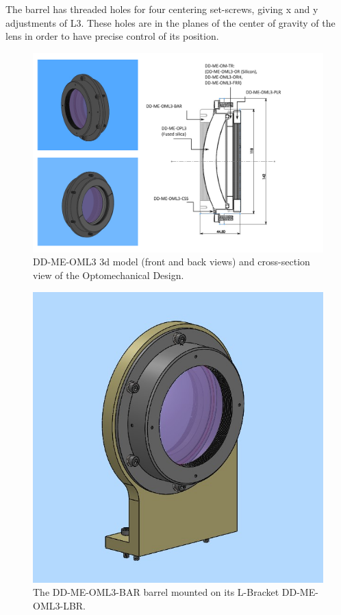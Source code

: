 \documentclass{report}
\begin{document}
The barrel has threaded holes for four centering set-screws, giving x and y adjustments of L3. These holes are in the planes of the center of gravity of the lens in order to have precise control of its position.

\begin{figure}
\begin{center}
\includegraphics[width=1.1\linewidth]{figures/DD-ME-OML3-ID.png}
\end{center}
\caption{DD-ME-OML3 3d model (front and back views) and cross-section view of the Optomechanical Design.}
\label{figure:OML3-ID}
\end{figure}

\begin{figure}
\begin{center}
\includegraphics[width=0.7\linewidth]{figures/DD-ME-OML3-PP_w_LBr_2021-12-24.jpg}
\end{center}
\caption{The DD-ME-OML3-BAR barrel mounted on its L-Bracket DD-ME-OML3-LBR.}
\label{figure:OML3-BR}
\end{figure}
\end{document}
